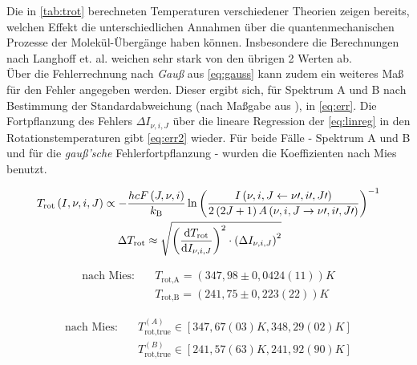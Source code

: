 \documentclass[numbers=noenddot,a4paper,notitlepage,twoside,BCOR15mm]{scrartcl}
\newcommand{\diff}{\textnormal{d}}
\newcommand{\ix}[1]{_\text{#1}}
\newcommand{\tilt}[1]{\textit{#1}}
\begin{document}

			Die in \autoref{tab:trot} berechneten Temperaturen verschiedener Theorien zeigen bereits, welchen Effekt die unterschiedlichen Annahmen über die quantenmechanischen Prozesse der Molekül-Übergänge haben können. Insbesondere die Berechnungen nach Langhoff et. al. weichen sehr stark von den übrigen 2 Werten ab.\\
			Über die Fehlerrechnung nach \tilt{Gauß} aus \autoref{eq:gauss} kann zudem ein weiteres Maß für den Fehler angegeben werden. Dieser ergibt sich, für Spektrum A und B nach Bestimmung der Standardabweichung (nach Maßgabe aus \cite{EMAUGreifswaldOHRotat}), in \autoref{eq:err}. Die Fortpflanzung des Fehlers $\Delta I_{\nu,i,J}$ über die lineare Regression der \autoref{eq:linreg} in den Rotationstemperaturen gibt \autoref{eq:err2} wieder. Für beide Fälle - Spektrum A und B und für die \tilt{gauß'sche} Fehlerfortpflanzung - wurden die Koeffizienten nach Mies benutzt.

				\begin{align}
					T\ix{rot}\left(I,\nu,i,J\right)\propto-&\frac{hcF\left(J,\nu,i\right)}{k\ix{B}}\ln\left(\frac{I\left(\nu,i,J\leftarrow\nu\prime,i\prime,J\prime\right)}{2\left(2J+1\right)A\left(\nu,i,J\rightarrow\nu\prime,i\prime,J\prime\right)}\right)^{-1} \\
					\Delta& T\ix{rot}\approx\sqrt{\left(\frac{\diff T\ix{rot}}{\diff I_{\nu,i,J}}\right)^2\cdot\left(\Delta I_{\nu,i,J}\right)^2} \label{eq:gauss}
				\end{align}

				\begin{align}
					\text{nach Mies:} \quad &T\ix{rot,A}=\left(347,98\pm 0,0424(11)\right)\unit{K} \label{eq:err}\\
					&T\ix{rot,B}=\left(241,75\pm 0,223(22)\right)\unit{K} \nonumber
				\end{align}

				\begin{align}
					\text{nach Mies:} \quad &T^{(A)}\ix{rot,true}\in\left[347,67(03)\unit{K},348,29(02)\unit{K}\right]  \label{eq:err2}\\
					&T^{(B)}\ix{rot,true}\in\left[241,57(63)\unit{K},241,92(90)\unit{K}\right] \nonumber
				\end{align}
\end{document}
